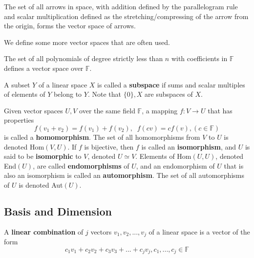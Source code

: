   \begin{example}
    The set of all arrows in space, with addition defined by the parallelogram rule and scalar multiplication defined as the stretching/compressing of the arrow from the origin, forms the vector space of arrows. 
  \end{example}

  We define some more vector spaces that are often used. 

  \begin{example}
    The set of all polynomials of degree strictly less than $n$ with coefficients in $\mathbb{F}$ defines a vector space over $\mathbb{F}$. 
  \end{example}

  \begin{definition}[Subspace]
    A subset $Y$ of a linear space $X$ is called a \textbf{subspace} if sums and scalar multiples of elements of $Y$ belong to $Y$. Note that $\{ 0 \}, X$ are subspaces of $X$. 
  \end{definition}

  \begin{definition}
    Given vector spaces $U, V$ over the same field $\mathbb{F}$, a mapping $f: V \longrightarrow U$ that has properties 
    \begin{equation}
      f(v_1 + v_2) = f(v_1) + f(v_2), \; \; f(c v) = c f(v), (c \in \mathbb{F})
    \end{equation}
    is called a \textbf{homomorphism}. The set of all homomorphisms from $V$ to $U$ is denoted Hom$(V, U)$. If $f$ is bijective, then $f$ is called an \textbf{isomorphism}, and $U$ is said to be \textbf{isomorphic} to $V$, denoted $U \simeq V$. Elements of Hom$(U,U)$, denoted End$(U)$, are called \textbf{endomorphisms} of $U$, and an endomorphism of $U$ that is also an isomorphism is called an \textbf{automorphism}. The set of all automorphisms of $U$ is denoted Aut$(U)$. 
  \end{definition}

\subsection{Basis and Dimension}

  \begin{definition}
    A \textbf{linear combination} of $j$ vectors $v_1, v_2, ..., v_j$ of a linear space is a vector of the form 
    \begin{equation}
      c_1 v_1 + c_2 v_2 + c_3 v_3 + ... + c_j v_j, c_1, ..., c_j \in \mathbb{F}
    \end{equation}
  \end{definition}


